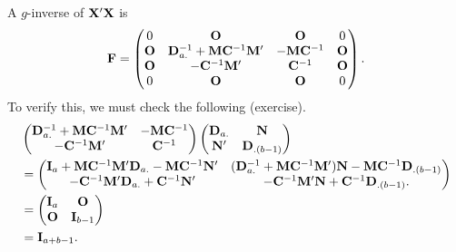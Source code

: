 A $ g $-inverse of $ \mathbf{X}'\mathbf{X} $ is
\[ \mathbf{F}=\begin{pmatrix}
        0          & \mathbf{O}                                                & \mathbf{O}                 & 0          \\
        \mathbf{O} & \mathbf{D}_{a.}^{-1}+\mathbf{M}\mathbf{C}^{-1}\mathbf{M}' & -\mathbf{M}\mathbf{C}^{-1} & \mathbf{O} \\
        \mathbf{O} & -\mathbf{C}^{-1}\mathbf{M}'                               & \mathbf{C}^{-1}            & \mathbf{O} \\
        0          & \mathbf{O}                                                & \mathbf{O}                 & 0          \\
    \end{pmatrix}. \]
To verify this, we must check the following (exercise).
\begin{align*}
     & \begin{pmatrix}
           \mathbf{D}_{a.}^{-1}+\mathbf{M}\mathbf{C}^{-1}\mathbf{M}' & -\mathbf{M}\mathbf{C}^{-1} \\
           -\mathbf{C}^{-1}\mathbf{M}'                               & \mathbf{C}^{-1}            \\
       \end{pmatrix}\begin{pmatrix}
                        \mathbf{D}_{a.} & \mathbf{N}          \\
                        \mathbf{N}'     & \mathbf{D}_{.(b-1)}
                    \end{pmatrix}                                                                                                                                        \\
     & =\begin{pmatrix}
            \mathbf{I}_a + \mathbf{M}\mathbf{C}^{-1}\mathbf{M}'\mathbf{D}_{a.}-\mathbf{M}\mathbf{C}^{-1}\mathbf{N}' & (\mathbf{D}_{a.}^{-1}+\mathbf{M}\mathbf{C}^{-1}\mathbf{M}')\mathbf{N}-\mathbf{M}\mathbf{C}^{-1}\mathbf{D}_{.(b-1)} \\
            -\mathbf{C}^{-1}\mathbf{M}'\mathbf{D}_{a.}+\mathbf{C}^{-1}\mathbf{N}'                                   & -\mathbf{C}^{-1}\mathbf{M}'\mathbf{N}+\mathbf{C}^{-1}\mathbf{D}_{.(b-1)}.
        \end{pmatrix} \\
     & =\begin{pmatrix}
            \mathbf{I}_a & \mathbf{O}       \\
            \mathbf{O}   & \mathbf{I}_{b-1}
        \end{pmatrix}                                                                                                                                                                                              \\
     & =\mathbf{I}_{a+b-1}.
\end{align*}